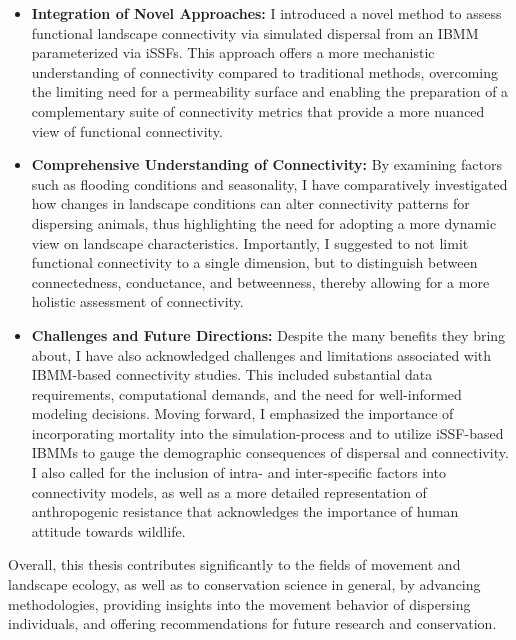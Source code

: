 \documentclass[../FinalThesis.tex]{subfiles}
\begin{document}
\begin{itemize}

  \item \textbf{Integration of Novel Approaches:} I introduced a novel method to
  assess functional landscape connectivity via simulated dispersal from an IBMM
  parameterized via iSSFs. This approach offers a more mechanistic understanding
  of connectivity compared to traditional methods, overcoming the limiting need
  for a permeability surface and enabling the preparation of a complementary
  suite of connectivity metrics that provide a more nuanced view of functional
  connectivity.

  \item \textbf{Comprehensive Understanding of Connectivity:} By examining
  factors such as flooding conditions and seasonality, I have comparatively
  investigated how changes in landscape conditions can alter connectivity
  patterns for dispersing animals, thus highlighting the need for adopting a
  more dynamic view on landscape characteristics. Importantly, I suggested to
  not limit functional connectivity to a single dimension, but to distinguish
  between connectedness, conductance, and betweenness, thereby allowing for a
  more holistic assessment of connectivity.

  \item \textbf{Challenges and Future Directions:} Despite the many benefits
  they bring about, I have also acknowledged challenges and limitations
  associated with IBMM-based connectivity studies. This included substantial
  data requirements, computational demands, and the need for well-informed
  modeling decisions. Moving forward, I emphasized the importance of
  incorporating mortality into the simulation-process and to utilize iSSF-based
  IBMMs to gauge the demographic consequences of dispersal and connectivity. I
  also called for the inclusion of intra- and inter-specific factors  into
  connectivity models, as well as a more detailed representation of
  anthropogenic resistance that acknowledges the importance of human attitude
  towards wildlife.

\end{itemize}

Overall, this thesis contributes significantly to the fields of movement and
landscape ecology, as well as to conservation science in general, by advancing
methodologies, providing insights into the movement behavior of dispersing
individuals, and offering recommendations for future research and conservation.

\end{document}
